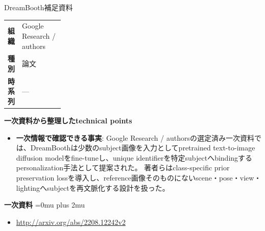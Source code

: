 \begin{technicalnote}{DreamBooth}{補足資料}
\begingroup
\begin{tabularx}{\linewidth}{@{}>{\bfseries}p{0.22\linewidth}X@{}}
組織 & Google Research / authors \\
種別 & 論文 \\
時系列 & — \\
\end{tabularx}
\smallskip
{\bfseries 一次資料から整理したtechnical points}
\begin{itemize}[leftmargin=1.5em,itemsep=0.35em]
\item \textbf{一次情報で確認できる事実}: Google Research / authorsの選定済み一次資料では、DreamBoothは少数のsubject画像を入力としてpretrained text-to-image diffusion modelをfine-tuneし、unique identifierを特定subjectへbindingするpersonalization手法として提案された。 著者らはclass-specific prior preservation lossを導入し、reference画像そのものにないscene・pose・view・lightingへsubjectを再文脈化する設計を扱った。
\end{itemize}
\begin{minipage}{\linewidth}
\begin{samepage}
{\bfseries 一次資料}
\begingroup\sloppy
\Urlmuskip=0mu plus 2mu\relax
\begin{itemize}[leftmargin=1.5em,itemsep=0.25em]
\item {\scriptsize\url{http://arxiv.org/abs/2208.12242v2}}
\end{itemize}
\endgroup
\end{samepage}
\end{minipage}
\endgroup
\end{technicalnote}
\medskip

